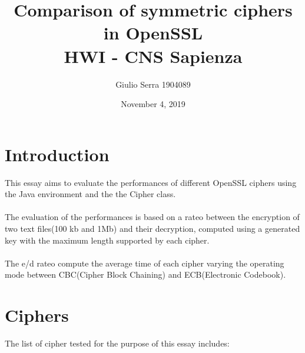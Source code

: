 \documentclass{article}
\begin{document}
\pagecolor{white}

\title{%
  Comparison of symmetric ciphers in OpenSSL \\
  \large HWI - CNS Sapienza}

\author{Giulio Serra 1904089}
\date{November 4, 2019}

\maketitle

\begin{titlepage}
\end{titlepage}

\tableofcontents

\begin{titlepage}
\end{titlepage}

\section{Introduction}\label{sec:intro}

This essay aims to evaluate the performances of different OpenSSL ciphers using the Java environment and the the Cipher class.\\
\\The evaluation of the performances is based on a rateo between the encryption of two text files(100 kb and 1Mb) and their decryption, computed using a generated key with the maximum length supported by each cipher.\\\\The e/d rateo compute the average time of each cipher varying the operating mode between CBC(Cipher Block Chaining) and ECB(Electronic Codebook).


\section{Ciphers}\label{sec:ciphers}
	
	The list of cipher tested for the purpose of this essay includes:
	
	
\end{document}
